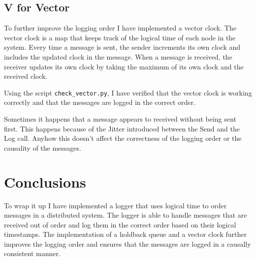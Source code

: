 \documentclass[a4paper, 11pt]{article}
\begin{document}
\subsection{V for Vector}
To further improve the logging order I have implemented a vector clock. The vector clock is a map that keeps track of the logical time of each node in the system. Every time a message is sent, the sender increments its own clock and includes the updated clock in the message. When a message is received, the receiver updates its own clock by taking the maximum of its own clock and the received clock.

Using the script \texttt{check\_vector.py}, I have verified that the vector clock is working correctly and that the messages are logged in the correct order.

Sometimes it happens that a message appears to received without being sent first. This happens because of the Jitter introduced between the Send and the Log call. Anyhow this doesn't affect the correctness of the logging order or the causality of the messages.

\section{Conclusions}

To wrap it up I have implemented a logger that uses logical time to order messages in a distributed system. The logger is able to handle messages that are received out of order and log them in the correct order based on their logical timestamps. The implementation of a holdback queue and a vector clock further improves the logging order and ensures that the messages are logged in a causally consistent manner.
\end{document}
